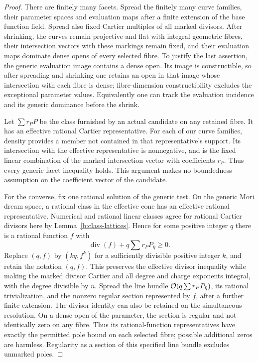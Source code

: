 \begin{proof}
There are finitely many facets. Spread the finitely many curve families,
their parameter spaces and evaluation maps after a finite extension of
the base function field. Spread also fixed Cartier multiples of all
marked divisors. After shrinking, the curves remain projective and flat
with integral geometric fibres, their intersection vectors with these
markings remain fixed, and their evaluation maps dominate dense opens of
every selected fibre. To justify the last assertion, the generic
evaluation image contains a dense open. Its image is constructible, so
after spreading and shrinking one retains an open in that image whose
intersection with each fibre is dense; fibre-dimension constructibility
excludes the exceptional parameter values. Equivalently one can track
the evaluation incidence and its generic dominance before the shrink.

Let \(\sum r_PP\) be the class furnished by an actual candidate on any
retained fibre. It has an effective rational Cartier representative.
For each of our curve families, density provides a member not contained
in that representative's support. Its intersection with the effective
representative is nonnegative, and is the fixed linear combination of
the marked intersection vector with coefficients \(r_P\). Thus every
generic facet inequality holds. This argument makes no boundedness
assumption on the coefficient vector of the candidate.

For the converse, fix one rational solution of the generic test.
On the generic Mori dream space, a rational class in the effective cone
has an effective rational representative. Numerical and rational linear
classes agree for rational Cartier divisors here by
Lemma~\ref{b:class-lattices}. Hence for some positive integer \(q\) there
is a rational function \(f\) with
\[
 \operatorname{div}(f)+q\sum r_PP_{\bar\eta}\geq0.
\]
Replace \((q,f)\) by \((kq,f^k)\) for a sufficiently divisible
positive integer \(k\), and retain the notation \((q,f)\). This
preserves the effective divisor inequality while making the marked
divisor Cartier and all degree and charge exponents integral, with
the degree divisible by \(n\). Spread the line bundle
\(\mathcal O(q\sum r_PP_{\bar\eta})\), its rational trivialization, and the
nonzero regular section represented by \(f\), after a further finite
extension. The divisor identity can also be retained on the simultaneous
resolution. On a dense open of the parameter, the section is regular and
not identically zero on any fibre. Thus its rational-function
representatives have exactly the permitted pole bound on each selected
fibre; possible additional zeros are harmless. Regularity as a section
of this specified line bundle excludes unmarked poles.


\end{proof}
